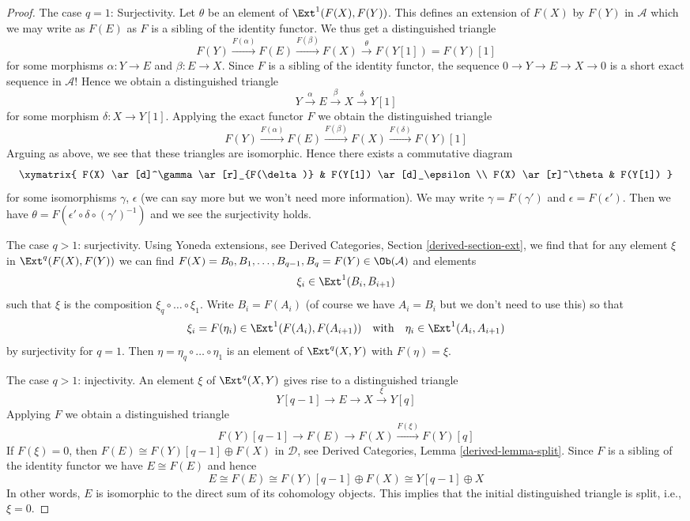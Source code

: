 \begin{proof}
\medskip\noindent
The case $q = 1$: Surjectivity. Let $\theta$ be an element of
$\Ext^1(F(X), F(Y))$. This defines an extension of $F(X)$ by $F(Y)$
in $\mathcal{A}$ which we may write as $F(E)$
as $F$ is a sibling of the identity functor. We thus get a distinguished
triangle
$$
F(Y) \xrightarrow{F(\alpha)} F(E)
\xrightarrow{F(\beta)} F(X)
\xrightarrow{\theta} F(Y[1]) = F(Y)[1]
$$
for some morphisms $\alpha : Y \to E$ and $\beta : E \to X$.
Since $F$ is a sibling of the identity functor, the sequence
$0 \to Y \to E \to X \to 0$
is a short exact sequence in $\mathcal{A}$! Hence we obtain a
distinguished triangle
$$
Y \xrightarrow{\alpha} E \xrightarrow{\beta} X \xrightarrow{\delta} Y[1]
$$
for some morphism $\delta : X \to Y[1]$. Applying the exact functor
$F$ we obtain the distinguished triangle
$$
F(Y) \xrightarrow{F(\alpha)} F(E) \xrightarrow{F(\beta)} F(X)
\xrightarrow{F(\delta)} F(Y)[1]
$$
Arguing as above, we see that these triangles are isomorphic.
Hence there exists a commutative diagram
$$
\xymatrix{
F(X) \ar[d]^\gamma \ar[r]_{F(\delta)} & F(Y[1]) \ar[d]_\epsilon \\
F(X) \ar[r]^\theta & F(Y[1])
}
$$
for some isomorphisms $\gamma$, $\epsilon$ (we can say more but we won't
need more information). We may write $\gamma = F(\gamma')$ and
$\epsilon = F(\epsilon')$. Then we have
$\theta = F(\epsilon' \circ \delta \circ (\gamma')^{-1})$
and we see the surjectivity holds.

\medskip\noindent
The case $q > 1$: surjectivity. Using Yoneda extensions, see
Derived Categories, Section \ref{derived-section-ext}, we find that for any
element $\xi$ in $\Ext^q(F(X), F(Y))$ we can find
$F(X) = B_0, B_1, \ldots, B_{q - 1}, B_q = F(Y) \in \Ob(\mathcal{A})$ and
elements
$$
\xi_i \in \Ext^1(B_i, B_{i + 1})
$$
such that $\xi$ is the composition $\xi_q \circ \ldots \circ \xi_1$.
Write $B_i = F(A_i)$ (of course we have $A_i = B_i$ but we don't
need to use this) so that
$$
\xi_i = F(\eta_i) \in \Ext^1(F(A_i), F(A_{i + 1}))
\quad\text{with}\quad
\eta_i \in \Ext^1(A_i, A_{i + 1})
$$
by surjectivity for $q = 1$. Then $\eta = \eta_q \circ \ldots \circ \eta_1$
is an element of $\Ext^q(X, Y)$ with $F(\eta) = \xi$.

\medskip\noindent
The case $q > 1$: injectivity. An element $\xi$ of $\Ext^q(X, Y)$
gives rise to a distinguished triangle
$$
Y[q - 1] \to E \to X \xrightarrow{\xi} Y[q]
$$
Applying $F$ we obtain a distinguished triangle
$$
F(Y)[q - 1] \to F(E) \to F(X) \xrightarrow{F(\xi)} F(Y)[q]
$$
If $F(\xi) = 0$, then $F(E) \cong F(Y)[q - 1] \oplus F(X)$
in $\mathcal{D}$, see
Derived Categories, Lemma \ref{derived-lemma-split}.
Since $F$ is a sibling of the identity functor we have
$E \cong F(E)$ and hence
$$
E \cong F(E) \cong F(Y)[q - 1] \oplus F(X) \cong Y[q - 1] \oplus X
$$
In other words, $E$ is isomorphic to the
direct sum of its cohomology objects. This implies that the
initial distinguished triangle is split, i.e., $\xi = 0$.
\end{proof}








